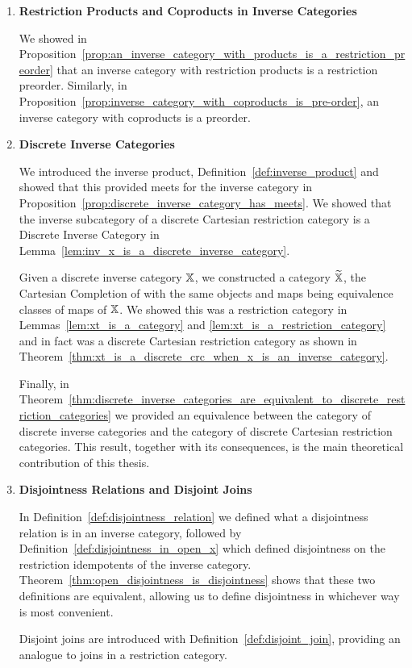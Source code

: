 \begin{enumerate}
\item \textbf{Restriction Products and Coproducts in Inverse Categories}

We showed in Proposition~\ref{prop:an_inverse_category_with_products_is_a_restriction_preorder} that
an inverse category with restriction products is a restriction preorder. Similarly, in
Proposition~\ref{prop:inverse_category_with_coproducts_is_pre-order}, an inverse category with
coproducts is a preorder.

\item \textbf{Discrete Inverse Categories}

We introduced the inverse product, Definition~\ref{def:inverse_product} and showed that this
provided meets for the inverse category in
Proposition~\ref{prop:discrete_inverse_category_has_meets}. We showed that the inverse subcategory
of a discrete Cartesian restriction category is a Discrete Inverse Category in
Lemma~\ref{lem:inv_x_is_a_discrete_inverse_category}.

Given a discrete inverse category $\mathbb{X}$, we constructed a category $\widetilde{\mathbb{X}}$, the Cartesian Completion of
\X with the same objects and maps being equivalence classes of maps of $\mathbb{X}$. We showed this was a
restriction category in Lemmas~\ref{lem:xt_is_a_category} and \ref{lem:xt_is_a_restriction_category}
and in fact was a discrete Cartesian restriction category as shown in
Theorem~\ref{thm:xt_is_a_discrete_crc_when_x_is_an_inverse_category}.

Finally, in
Theorem~\ref{thm:discrete_inverse_categories_are_equivalent_to_discrete_restriction_categories} we
provided an equivalence between the category of discrete inverse categories and the category
of discrete Cartesian restriction categories. This result, together with its consequences, is the
main theoretical contribution of this thesis.

\item \textbf{Disjointness Relations and Disjoint Joins}

In Definition~\ref{def:disjointness_relation} we defined what a disjointness relation is in an
inverse category, followed by Definition~\ref{def:disjointness_in_open_x} which defined disjointness
on the restriction idempotents of the inverse
category. Theorem~\ref{thm:open_disjointness_is_disjointness} shows that these two definitions are
equivalent, allowing us to define disjointness in whichever way is most convenient.

Disjoint joins are introduced with Definition~\ref{def:disjoint_join}, providing an analogue to
joins in a restriction category.


\end{enumerate}
